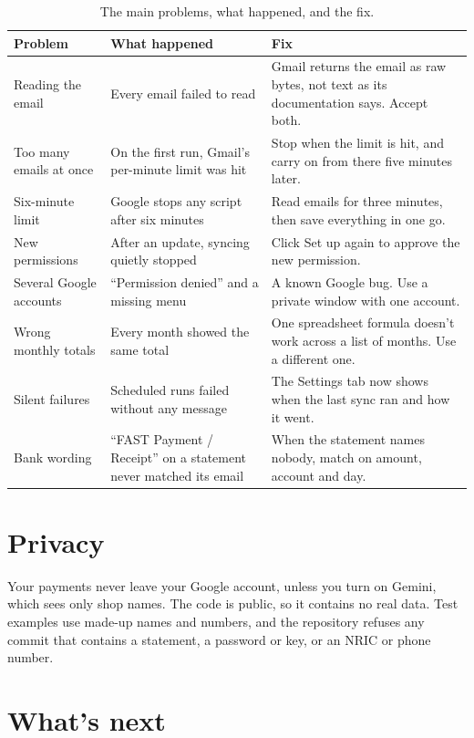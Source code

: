 \documentclass[10pt]{article}
\renewcommand{\arraystretch}{1.25}
\begin{document}
\begin{table}[H]
\centering\footnotesize\renewcommand{\arraystretch}{1.12}
\begin{tabularx}{\linewidth}{@{}>{\raggedright\arraybackslash}p{2.8cm}LL@{}}
\toprule
\textbf{Problem} & \textbf{What happened} & \textbf{Fix} \\
\midrule
Reading the email & Every email failed to read & Gmail returns the email as raw bytes, not text as its documentation says. Accept both. \\
Too many emails at once & On the first run, Gmail's per-minute limit was hit & Stop when the limit is hit, and carry on from there five minutes later. \\
Six-minute limit & Google stops any script after six minutes & Read emails for three minutes, then save everything in one go. \\
New permissions & After an update, syncing quietly stopped & Click Set up again to approve the new permission. \\
Several Google accounts & ``Permission denied'' and a missing menu & A known Google bug. Use a private window with one account. \\
Wrong monthly totals & Every month showed the same total & One spreadsheet formula doesn't work across a list of months. Use a different one. \\
Silent failures & Scheduled runs failed without any message & The Settings tab now shows when the last sync ran and how it went. \\
Bank wording & ``FAST Payment / Receipt'' on a statement never matched its email & When the statement names nobody, match on amount, account and day. \\
\bottomrule
\end{tabularx}
\caption{The main problems, what happened, and the fix.}
\label{tab:problems}
\end{table}

\section{Privacy}

Your payments never leave your Google account, unless you turn on Gemini, which sees only shop names. The code is public, so it contains no real data. Test examples use made-up names and numbers, and the repository refuses any commit that contains a statement, a password or key, or an NRIC or phone number.

\section{What's next}
\end{document}
